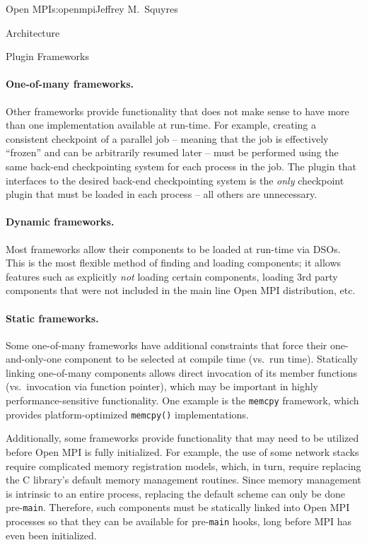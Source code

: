\begin{aosachapter}{Open MPI}{s:openmpi}{Jeffrey M.\ Squyres}
\begin{aosasect1}{Architecture}
\begin{aosasect2}{Plugin Frameworks}

\paragraph{One-of-many frameworks.} 

Other frameworks provide functionality that does not make sense to
have more than one implementation available at run-time.
%
For example, creating a consistent checkpoint of a parallel job --
meaning that the job is effectively ``frozen'' and can be arbitrarily
resumed later -- must be performed using the same back-end
checkpointing system for each process in the job.
%
The plugin that interfaces to the desired back-end checkpointing
system is the {\em only} checkpoint plugin that must be loaded in each
process -- all others are unnecessary.


\paragraph{Dynamic frameworks.} 

Most frameworks allow their components to be loaded at run-time via
DSOs.  This is the most flexible method of finding and loading
components; it allows features such as explicitly {\em not} loading
certain components, loading 3rd party components that were not
included in the main line Open MPI distribution, etc.


\paragraph{Static frameworks.} 

Some one-of-many frameworks have additional constraints that force
their one-and-only-one component to be selected at compile time (vs.\
run time).  Statically linking one-of-many components allows direct
invocation of its member functions (vs.\ invocation via function
pointer), which may be important in highly performance-sensitive
functionality.  One example is the {\tt memcpy} framework, which
provides platform-optimized {\tt memcpy()} implementations.

Additionally, some frameworks provide functionality that may need to
be utilized before Open MPI is fully initialized.  
%
For example, the use of some network stacks require complicated memory
registration models, which, in turn, require replacing the C library's
default memory management routines.
%
Since memory management is intrinsic to an entire process, replacing
the default scheme can only be done pre-{\tt main}.
%
Therefore, such components must be statically linked into Open MPI
processes so that they can be available for pre-{\tt main} hooks, long
before MPI has even been initialized.


\end{aosasect2}
\end{aosasect1}
\end{aosachapter}
